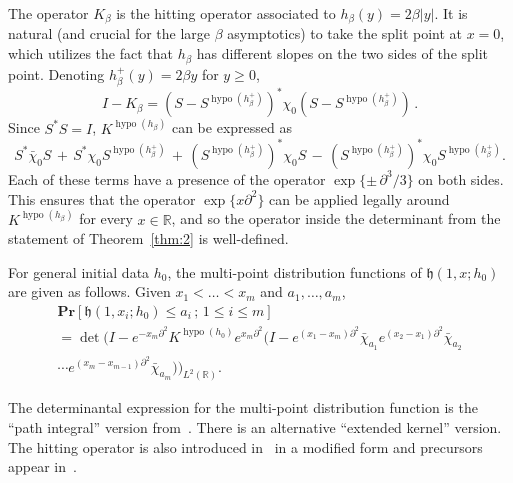 \documentclass[AHL,Unicode,longabstracts]{cedram}
\newcommand{\scdots}{{\mk{\cdot}\mK{\cdot}\mK{\cdot}\mk}}
\DeclareMathOperator{\hypo}{hypo}
\newcommand{\pr}[1]{\mathbf{Pr}\left[#1\right]}
\newcommand{\R}{\mathbb{R}}
\newcommand{\h}{\mathfrak{h}}
\newcommand*{\mk}{\mkern -1mu}
\newcommand*{\Mk}{\mkern -2mu}
\newcommand*{\mK}{\mkern 1mu}
\newcommand*{\MK}{\mkern 2mu}
\begin{document}
The operator $K_{\beta}$ is the hitting operator associated to $h_{\beta}(y) = 2\beta |y|$. It is natural (and crucial for the large $\beta$ asymptotics) to take the split point at $x = 0$, which utilizes the fact that $h_{\beta}$ has different slopes on the two sides of the split point. Denoting $h^{+}_{\beta}(y) = 2 \beta y$ for $y \geq 0$,
\begin{equation}\label{eqn:Khypo}
I - K_{\beta} = \left (S - S^{\hypo(h^{+}_{\beta})}\right)^{*} \chi_0
\left (S - S^{\hypo(h^{+}_{\beta})}\right)\,.
\end{equation}
Since $S^{*} S = I$, $K^{\hypo(h_{\beta})}$ can be expressed as
\[
S^{*} \bar{\chi}_0S \,+\, S^{*} \chi_0 S^{\hypo(h^{+}_{\beta})} \,+\, (S^{\hypo(h^{+}_{\beta})})^{*} \chi_0 S \,-\,
(S^{\hypo(h^{+}_{\beta})})^{*} \chi_0 S^{\hypo(h^{+}_{\beta})}.
\]
Each of these terms have a presence of the operator $\exp \{ \pm \, \partial^3/3 \}$ on both sides. This ensures that the operator $\exp\{ x \partial^2\}$ can be applied legally around $K^{\hypo(h_{\beta})}$ for every $x \in \R$, and so the operator inside the determinant from the statement of Theorem~\ref{thm:2} is well-defined.

For general initial data $h_0$, the multi-point distribution functions of $\h(1,x; h_0)$ are given as follows. Given $x_1 < \dots < x_m$ and $a_1, \dots, a_m$,
\begin{multline}\label{eqn:KPZjoint}
\pr{\h (1,x_i; h_0) \leq a_i\,;\, 1 \leq i \leq m} \\
=\det\Big(I-e^{-x_m \partial^2} K^{\hypo(h_0)}e^{x_m \partial^2}
\big(I-e^{(x_1-x_m)\partial^2}\bar{\chi}_{a_1} e^{(x_2-x_1)\partial^2} \bar{\chi}_{a_2}\\
\cdots e^{(x_m-x_{m-1})\partial^2} \bar{\chi}_{a_m}\big)\Big)_{L^2(\R)}.
\end{multline}

The determinantal expression for the multi-point distribution function is the ``path integral'' version from~\cite{MQR}. There is an alternative ``extended kernel'' version. The hitting operator is also introduced in~\cite{QR1} in a modified form and precursors appear in~\cite{BCR, CQR, PS, QR3}.
\end{document}
